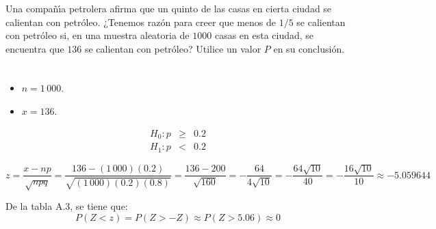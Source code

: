 \begin{enunciado}
 Una compa\~n\'{\i}a petrolera afirma que un quinto de las casas en cierta ciudad
 se calientan con petr\'oleo.
 ¿Tenemos raz\'on para creer que menos de $1/5$ se calientan con petr\'oleo
 si, en una muestra aleatoria de $1000$ casas en esta ciudad, se encuentra
 que $136$ se calientan con petr\'oleo? Utilice un valor $P$ en su conclusi\'on.
\end{enunciado}

\begin{solucion}
 \begin{datos}
  $\phantom{0}$
  \begin{itemize}
   \item $n = 1\,000$.
   \item $x = 136$.
  \end{itemize}
 \end{datos}

 \begin{hipotesis}
  \begin{eqnarray*}
   H_0: p & \geq & 0.2 \\
   H_1: p &  <   & 0.2
  \end{eqnarray*}
 \end{hipotesis}

 \begin{estadistico}
  \begin{equation*}
   z = \frac{x - np}{\sqrt{npq}}
   = \frac{136 - (1\,000)(0.2)}{\sqrt{(1\,000)(0.2)(0.8)}}
   = \frac{136 - 200}{\sqrt{160}} = - \frac{64}{4\sqrt{10}}
   = - \frac{64\sqrt{10}}{40} = - \frac{16\sqrt{10}}{10} \approx - 5.059644
  \end{equation*}
 \end{estadistico}
 
 \begin{valorp}
  De la tabla A.3, se tiene que:
  \begin{equation*}
   P(Z < z) = P(Z > -Z) \approx P(Z > 5.06) \approx 0
  \end{equation*}
 \end{valorp}
 

\end{solucion}
